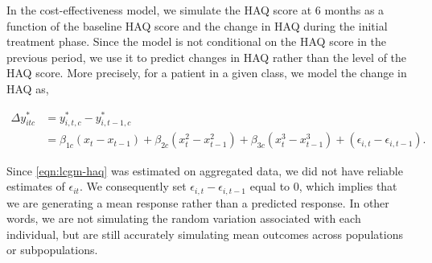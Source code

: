 \documentclass[11pt,final,fleqn]{article}\usepackage[]{graphicx}\usepackage[]{color}
\theoremstyle{plain}
\begin{document}
\begin{appendices}
In the cost-effectiveness model, we simulate the HAQ score at 6 months as a function of the baseline HAQ score and the change in HAQ during the initial treatment phase. Since the \citet{norton2014health} model is not conditional on the HAQ score in the previous period, we use it to predict changes in HAQ rather than the level of the HAQ score. More precisely, for a patient in a given class, we model the change in HAQ as,  

\begin{align}\label{eqn:lcgm-dhaq}
\Delta y_{itc}^{*} &= y_{i,t,c}^{*} - y_{i,t-1,c}^{*} \\
&= \beta_{1c}(x_t - x_{t-1}) + \beta_{2c}(x_t^2 - x_{t-1}^2) + \beta_{3c}(x_t^3-x_{t-1}^3) + (\epsilon_{i,t} - \epsilon_{i,t-1}). \nonumber
\end{align}

Since \autoref{eqn:lcgm-haq} was estimated on aggregated data, we did not have reliable estimates of $\epsilon_{it}$. We consequently set $\epsilon_{i,t} - \epsilon_{i,t-1}$ equal to 0, which implies that we are generating a mean response rather than a predicted response. In other words, we are not simulating the random variation associated with each individual, but are still accurately simulating mean outcomes across populations or subpopulations. 


\end{appendices}
\end{document}
